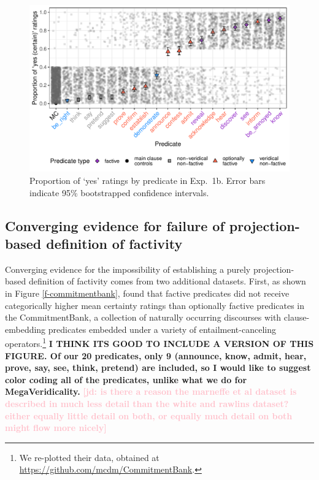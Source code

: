 \documentclass[11pt,fleqn]{article}
\newcommand{\jd}[1]{\textbf{\textcolor{Pink}{[jd: #1]}}}
\newcommand{\6}{\mbox{$[\hspace*{-.6mm}[$}}
\newcommand{\9}{\mbox{$]\hspace*{-.6mm}]$}}
\begin{document}
\begin{figure}[H]

\centering
\includegraphics[width=.7\paperwidth]{../../results/8-projectivity-no-fact-binary/graphs/proportion-by-predicate-variability}
\caption{Proportion of `yes' ratings by predicate in Exp.~1b. Error bars indicate 95\% bootstrapped confidence intervals.}
\label{f-projectivity2}

\end{figure}


\subsection{Converging evidence for failure of projection-based definition of factivity}

Converging evidence for the impossibility of establishing a purely projection-based definition of factivity comes from two additional datasets. First, as shown in Figure \ref{f-commitmentbank}, \citet*{demarneffe-etal-sub23} found that factive predicates did not receive categorically higher mean certainty ratings than optionally factive predicates in the CommitmentBank, a collection of naturally occurring discourses with clause-embedding predicates embedded under a variety of entailment-canceling operators.\footnote{We re-plotted their data, obtained at \url{https://github.com/mcdm/CommitmentBank}.} {\bf I THINK ITS GOOD TO INCLUDE A VERSION OF THIS FIGURE.  Of our 20 predicates, only 9 (announce, know, admit, hear, prove, say, see, think, pretend) are included, so I would like to suggest color coding all of the predicates, unlike what we do for MegaVeridicality.} \jd{is there a reason the marneffe et al dataset is described in much less detail than the white and rawlins dataset? either equally little detail on both, or equally much detail on both might flow more nicely}
\end{document}
